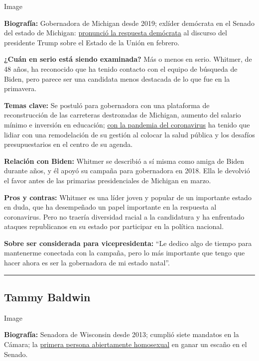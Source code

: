 Image

\textbf{Biografía:} Gobernadora de Michigan desde 2019; exlíder
demócrata en el Senado del estado de Michigan:
\href{https://www.nytimes.com/2020/02/04/us/politics/gretchen-whitmer-state-of-the-union.html}{pronunció
la respuesta demócrata} al discurso del presidente Trump sobre el Estado
de la Unión en febrero.

\textbf{¿Cuán en serio está siendo examinada?} Más o menos en serio.
Whitmer, de 48 años, ha reconocido que ha tenido contacto con el equipo
de búsqueda de Biden, pero parece ser una candidata menos destacada de
lo que fue en la primavera.

\textbf{Temas clave:} Se postuló para gobernadora con una plataforma de
reconstrucción de las carreteras destrozadas de Michigan, aumento del
salario mínimo e inversión en educación;
\href{https://www.nytimes.com/2020/04/18/us/politics/gretchen-whitmer-michigan-protests.html}{con
la pandemia del coronavirus} ha tenido que lidiar con una remodelación
de su gestión al colocar la salud pública y los desafíos presupuestarios
en el centro de su agenda.

\textbf{Relación con Biden:} Whitmer se describió a sí misma como amiga
de Biden durante años, y él apoyó su campaña para gobernadora en 2018.
Ella le devolvió el favor antes de las primarias presidenciales de
Michigan en marzo.

\textbf{Pros y contras:} Whitmer es una líder joven y popular de un
importante estado en duda, que ha desempeñado un papel importante en la
respuesta al coronavirus. Pero no traería diversidad racial a la
candidatura y ha enfrentado ataques republicanos en su estado por
participar en la política nacional.

\textbf{Sobre ser considerada para vicepresidenta:} ``Le dedico algo de
tiempo para mantenerme conectada con la campaña, pero lo más importante
que tengo que hacer ahora es ser la gobernadora de mi estado natal''.

\begin{center}\rule{0.5\linewidth}{\linethickness}\end{center}

\hypertarget{tammy-baldwin}{%
\subsection{Tammy Baldwin}\label{tammy-baldwin}}

Image

\textbf{Biografía:} Senadora de Wisconsin desde 2013; cumplió siete
mandatos en la Cámara; la
\href{https://www.nytimes.com/2012/11/04/fashion/tammy-baldwin-on-the-edge-of-making-history.html}{primera
persona abiertamente homosexual} en ganar un escaño en el Senado.

